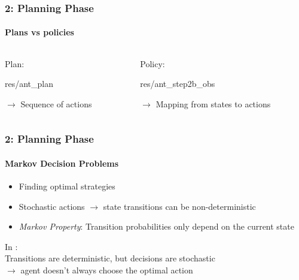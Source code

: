 \documentclass[11pt]{beamer}
\begin{document}
\begin{frame}
	\frametitle{2: Planning Phase}
	\framesubtitle{Plans vs policies}
	\begin{columns}
		\begin{column}{0.5\textwidth}
			Plan:
			\vspace*{1em}
			
				\begin{overpic}[width=0.8\textwidth,tics=10]{res/ant_plan}
				\end{overpic}
				
		$\rightarrow$ Sequence of actions
		\end{column}
		\begin{column}{0.5\textwidth}  %
			Policy:
			\vspace*{1em}
			
				\begin{overpic}[width=0.8\textwidth,tics=10]{res/ant_step2b_obs}
				\end{overpic}
			
		$\rightarrow$ Mapping from states to actions
		\end{column}
	\end{columns}
\end{frame}

\begin{frame}
	\frametitle{2: Planning Phase}
	\framesubtitle{Markov Decision Problems}
	\begin{itemize}
		\item Finding optimal strategies
		\item Stochastic actions $\rightarrow$ state transitions can be non-deterministic
		\item \textit{Markov Property}: Transition probabilities only depend on the current state
	\end{itemize}
\vspace*{2em}
In :\\%
Transitions are deterministic, but decisions are stochastic\\
$\rightarrow$ agent doesn't always choose the optimal action
	
\end{frame}
\end{document}
